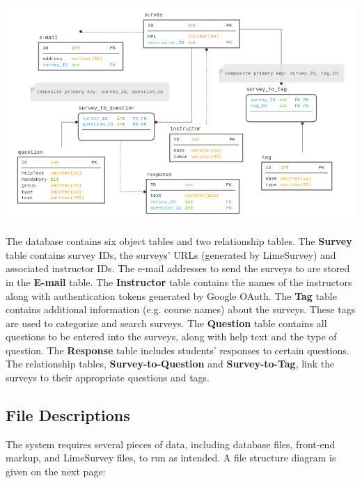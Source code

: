 \documentclass{article}
\begin{document}
\vspace{3in}
\begin{center}
\label{fig:schemadiagram}
{\includegraphics[scale=.6]{images/schema_diagram.png}} 
\end{center}

\vspace{5mm}

The database contains six object tables and two relationship tables. The \textbf{Survey} table contains survey IDs, the surveys' URLs (generated by LimeSurvey) and associated instructor IDs. The e-mail addresses to send the surveys to are stored in the \textbf{E-mail} table. The \textbf{Instructor} table contains the names of the instructors along with authentication tokens generated by Google OAuth. The \textbf{Tag} table contains additional information (e.g. course names) about the surveys. These tags are used to categorize and search surveys. The \textbf{Question} table contains all questions to be entered into the surveys, along with help text and the type of question. The \textbf{Response} table includes students' responses to certain questions. The relationship tables, \textbf{Survey-to-Question} and \textbf{Survey-to-Tag}, link the surveys to their appropriate questions and tags.



\subsection{File Descriptions}

The system requires several pieces of data, including database files, front-end markup, and LimeSurvey files, to run as intended. A file structure diagram is given on the next page:
\end{document}
